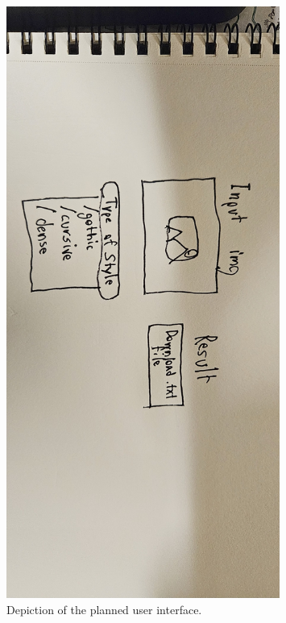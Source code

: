 \documentclass[12pt]{article}
\begin{document}
	\begin{figure}[htbp]
        \centering
		\includegraphics[height=0.8\textheight, width=0.8\textwidth]{./jp.jpeg}
        \caption{Depiction of the planned user interface.}
        \label{fig:myfigure1}
    \end{figure}
\newpage
\end{document}
